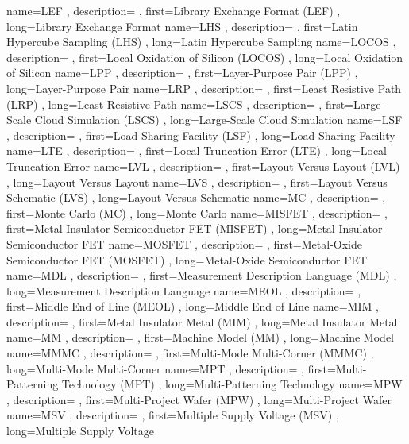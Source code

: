 { name={LEF}
, description={}
, first={Library Exchange Format (LEF)}
, long={Library Exchange Format}
}
{ name={LHS}
, description={}
, first={Latin Hypercube Sampling (LHS)}
, long={Latin Hypercube Sampling}
}
{ name={LOCOS}
, description={}
, first={Local Oxidation of Silicon (LOCOS)}
, long={Local Oxidation of Silicon}
}
{ name={LPP}
, description={}
, first={Layer-Purpose Pair (LPP)}
, long={Layer-Purpose Pair}
}
{ name={LRP}
, description={}
, first={Least Resistive Path (LRP)}
, long={Least Resistive Path}
}
{ name={LSCS}
, description={}
, first={Large-Scale Cloud Simulation (LSCS)}
, long={Large-Scale Cloud Simulation}
}
{ name={LSF}
, description={}
, first={Load Sharing Facility (LSF)}
, long={Load Sharing Facility}
}
{ name={LTE}
, description={}
, first={Local Truncation Error (LTE)}
, long={Local Truncation Error}
}
{ name={LVL}
, description={}
, first={Layout Versus Layout (LVL)}
, long={Layout Versus Layout}
}
{ name={LVS}
, description={}
, first={Layout Versus Schematic (LVS)}
, long={Layout Versus Schematic}
}
{ name={MC}
, description={}
, first={Monte Carlo (MC)}
, long={Monte Carlo}
}
{ name={MISFET}
, description={}
, first={Metal-Insulator Semiconductor FET (MISFET)}
, long={Metal-Insulator Semiconductor FET}
}
{ name={MOSFET}
, description={}
, first={Metal-Oxide Semiconductor FET (MOSFET)}
, long={Metal-Oxide Semiconductor FET}
}
{ name={MDL}
, description={}
, first={Measurement Description Language (MDL)}
, long={Measurement Description Language}
}
{ name={MEOL}
, description={}
, first={Middle End of Line (MEOL)}
, long={Middle End of Line}
}
{ name={MIM}
, description={}
, first={Metal Insulator Metal (MIM)}
, long={Metal Insulator Metal}
}
{ name={MM}
, description={}
, first={Machine Model (MM)}
, long={Machine Model}
}
{ name={MMMC}
, description={}
, first={Multi-Mode Multi-Corner (MMMC)}
, long={Multi-Mode Multi-Corner}
}
{ name={MPT}
, description={}
, first={Multi-Patterning Technology (MPT)}
, long={Multi-Patterning Technology}
}
{ name={MPW}
, description={}
, first={Multi-Project Wafer (MPW)}
, long={Multi-Project Wafer}
}
{ name={MSV}
, description={}
, first={Multiple Supply Voltage (MSV)}
, long={Multiple Supply Voltage}
}

